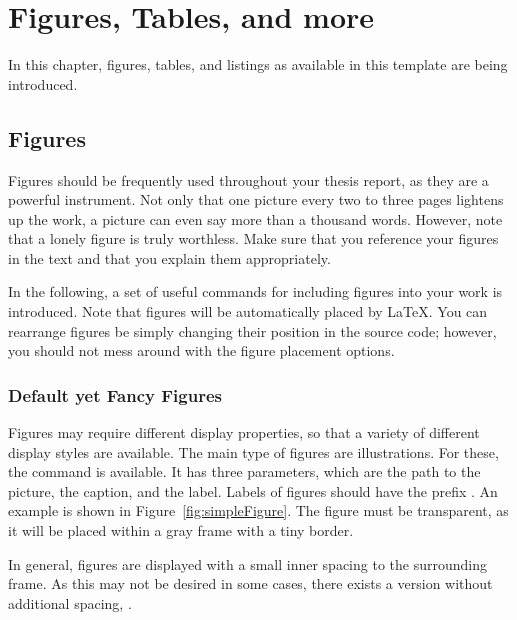 \chapter{Figures, Tables, and more}

In this chapter, figures, tables, and listings as available in this template are being introduced.


\section{Figures}\label{sec:figures}

Figures should be frequently used throughout your thesis report, as they are a powerful instrument. Not only that one picture every two to three pages lightens up the work, a picture can even say more than a thousand words. However, note that a lonely figure is truly worthless. Make sure that you reference your figures in the text and that you explain them appropriately.

In the following, a set of useful commands for including figures into your work is introduced. Note that figures will be automatically placed by \LaTeX. You can rearrange figures be simply changing their position in the source code; however, you should not mess around with the figure placement options.


\subsection{Default yet Fancy Figures}\label{sub:simpleFigures}

Figures may require different display properties, so that a variety of different display styles are available. The main type of figures are illustrations. For these, the  command is available. It has three parameters, which are the path to the picture, the caption, and the label. Labels of figures should have the prefix . An example is shown in Figure~\ref{fig:simpleFigure}. The figure must be transparent, as it will be placed within a gray frame with a tiny border.


In general, figures are displayed with a small inner spacing to the surrounding frame. As this may not be desired in some cases, there exists a version without additional spacing, .



